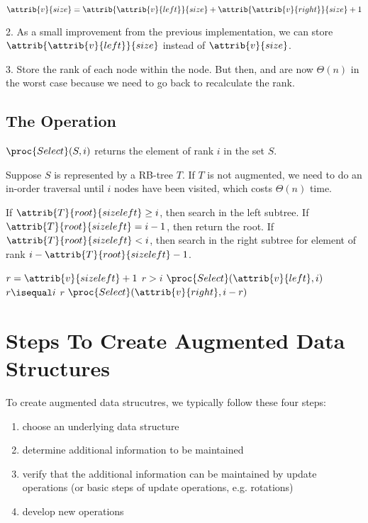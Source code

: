 $$
\attrib{v}{size} = \attrib{\attrib{v}{left}}{size} + \attrib{\attrib{v}{right}}{size} + 1
$$

2. As a small improvement from the previous implementation, we can store $\attrib{\attrib{v}{left}}{size}$ instead of $\attrib{v}{size}$.

3. Store the rank of each node within the node. But then,  and  are now $\Theta(n)$ in the worst case because we need to go back to recalculate the rank.

\subsection{The  Operation}

$\proc{Select}(S,i)$ returns the element of rank $i$ in the set $S$.

Suppose $S$ is represented by a RB-tree $T$. If $T$ is not augmented, we need to do an in-order traversal until $i$ nodes have been visited, which costs $\Theta(n)$ time.

If $\attrib{T}{root}{sizeleft} \geq i$, then search in the left subtree. If $\attrib{T}{root}{sizeleft} = i-1$, then return the root. If $\attrib{T}{root}{sizeleft} < i$, then search in the right subtree for element of rank $i - \attrib{T}{root}{sizeleft} - 1$.

\begin{codebox}
    \li $r = \attrib{v}{sizeleft} + 1$
    \li \If $r > i$ \Then
        \li \Return $\proc{Select}(\attrib{v}{left}, i)$
    \li \ElseIf $r \isequal i$ \Then
        \li \Return $r$
    \End
    \li \Return $\proc{Select}(\attrib{v}{right}, i-r)$
\end{codebox}

\section{Steps To Create Augmented Data Structures}

To create augmented data strucutres, we typically follow these four steps:

\begin{enumerate}
    \item choose an underlying data structure
    \item determine additional information to be maintained
    \item verify that the additional information can be maintained by update operations (or basic steps of update operations, e.g. rotations)
    \item develop new operations
\end{enumerate}

